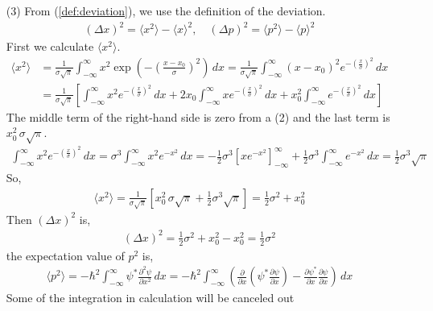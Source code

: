 \documentclass[floatfix,nofootinbib,superscriptaddress,fleqn]{revtex4}
\begin{document}
\begin{itemize}
\item[(3)] From (\ref{def:deviation}), we use the definition of the deviation.
  \begin{align}
    {(\Delta x)}^2 = \langle x^2\rangle - \langle x\rangle^2 ,\quad {(\Delta p)}^2 
    = \langle p^2\rangle - \langle p\rangle^2 
  \end{align}
First we calculate $\langle x^2\rangle$.
  \begin{align}
    \langle x^2\rangle 
    &= \frac{1}{\sigma\sqrt{\pi}}\int_{-\infty}^{\infty} x^2 
    \exp\left(-{\left( \frac{x-x_0}{\sigma}\right)}^2\right)\,dx 
    = \frac{1}{\sigma\sqrt{\pi}}\int_{-\infty}^{\infty} (x-x_0)^2 
    e^{-{\left( \frac{x}{\sigma}\right)}^2}\,dx 
    \\
    &= \frac{1}{\sigma\sqrt{\pi}}\left[\int_{-\infty}^{\infty} x^2 
    e^{-{\left( \frac{x}{\sigma} \right)}^2}\,dx
    +2x_0\int_{-\infty}^{\infty} xe^{-{\left(\frac{x}{\sigma}\right)}^2}\,dx
    +x^2_0\int_{-\infty}^{\infty} e^{-{\left(\frac{x}{\sigma}\right)}^2}\,dx\right]
  \end{align}
The middle term of the right-hand side is zero from a (2) 
and the last term is $x^2_0\,\sigma\sqrt{\pi}$.
  \begin{align}
    \int_{-\infty}^{\infty} x^2 e^{-{\left( \frac{x}{\sigma} \right)}^2}\,dx 
    = \sigma^3\int_{-\infty}^{\infty} x^2 e^{-x^2}\,dx 
    = -\frac{1}{2}\sigma^3{\left[xe^{-x^2}\right]}^{\infty}_{-\infty}
      +\frac{1}{2}\sigma^3\int_{-\infty}^{\infty} e^{-x^2}\,dx
    = \frac{1}{2}\sigma^3\sqrt{\pi}
  \end{align}
So,
  \begin{align}
    \langle x^2 \rangle = \frac{1}{\sigma\sqrt{\pi}}\left[x^2_0\,\sigma\sqrt{\pi}
    +\frac{1}{2}\sigma^3\sqrt{\pi}\right]
   =\frac{1}{2}\sigma^2+x_0^2
  \end{align}
Then $\left(\Delta x\right)^2$ is,
  \begin{align}
    \left(\Delta x\right)^2 = \frac{1}{2}\sigma^2+x_0^2 - x_0^2 = \frac{1}{2}\sigma^2
  \end{align}
the expectation value of $p^2$ is,
  \begin{align}
    \langle p^2 \rangle = -\hbar^2 \int_{-\infty}^{\infty} \psi^* 
    \frac{\partial^2 \psi}{\partial x^2}\,dx 
    = -\hbar^2\int_{-\infty}^{\infty} \left(\frac{\partial}{\partial x} 
    \left(\psi^*\frac{\partial \psi}{\partial x}\right) 
    -\frac{\partial \psi^*}{\partial x}\frac{\partial\psi}{\partial x}\right)\,dx
  \end{align}
Some of the integration in calculation will be canceled out 

\end{itemize}
\end{document}
